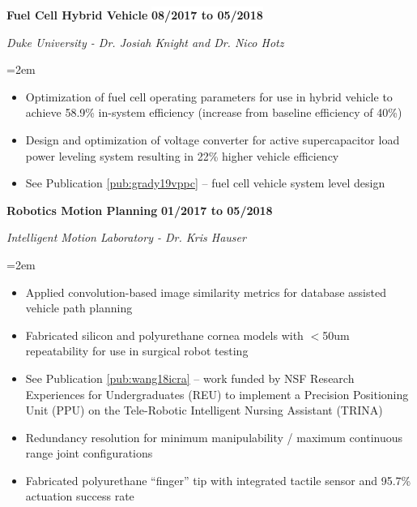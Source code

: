 \documentclass[paper=letter,fontsize=11pt]{scrartcl} %
\newcommand{\sepspace}{\vspace*{0em}}		%
\newcommand{\NewPart}[2]{\section*{\uppercase{#1} #2}}
\newcommand{\SkillsEntry}[2]{				  %
	\noindent \textbf{#1} \hfill \par      %
	\noindent\hangindent=2em\hangafter=0 \small #2 %
	\normalsize \par}  %
\newcommand{\EducationEntry}[4]{
		\noindent \textbf{#1} \hfill      %
		\colorbox{White}{%
			\bf 
			\parbox{10em}{%
			\hfill\color{Black}#2}} \par  %
		\noindent \textit{#3} \par        %
		\noindent\hangindent=2em\hangafter=0 \small #4 %
		\normalsize \par}
\newcommand{\WorkEntry}[4]{				  %
		\noindent \textbf{#1} \hfill      %
		\colorbox{White}{\bf \color{Black}#2} \par  %
		\noindent \textit{#3} \par              %
		\noindent\hangindent=2em\hangafter=0 \small #4 %
		\normalsize \par}
\begin{document}
\WorkEntry{Fuel Cell Hybrid Vehicle}{08/2017 to 05/2018}{Duke University - Dr. Josiah Knight and Dr. Nico Hotz}{
	\begin{itemize}
		\item Optimization of fuel cell operating parameters for use in hybrid vehicle to achieve 58.9\% in-system efficiency (increase from baseline efficiency of 40\%)
		\item Design and optimization of voltage converter for active supercapacitor load power leveling system resulting in 22\% higher vehicle efficiency
		\item See Publication \ref{pub:grady19vppc} -- fuel cell vehicle system level design %
	\end{itemize}
}
\sepspace

\WorkEntry{Robotics Motion Planning}{01/2017 to 05/2018}{Intelligent Motion Laboratory - Dr. Kris Hauser}{
	\begin{itemize}
		\item Applied convolution-based image similarity metrics for database assisted vehicle path planning
		\item Fabricated silicon and polyurethane cornea models with $<$50um repeatability for use in surgical robot testing
		\item See Publication \ref{pub:wang18icra} -- work funded by NSF Research Experiences for Undergraduates (REU) to implement a Precision Positioning Unit (PPU) on the Tele-Robotic Intelligent Nursing Assistant (TRINA)
		\item Redundancy resolution for minimum manipulability / maximum continuous range joint configurations
		\item Fabricated polyurethane “finger” tip with integrated tactile sensor and 95.7\% actuation success rate
	\end{itemize}
}


\end{document}
